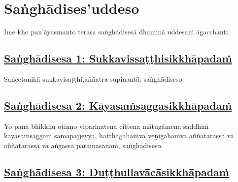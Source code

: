 
\setsecheadstyle{\sectionFmt}
\section{Saṅghādises'uddeso}
\label{sd}

\begin{intro}
	Ime kho pan'āyasmanto terasa saṅghādisesā dhammā uddesaṁ āgacchanti.
\end{intro}

\subsection*{\hyperref[comm1]{Saṅghādisesa 1: Sukkavissaṭṭhisikkhāpadaṁ}}

\label{sd1}

Sañcetanikā sukkavisaṭṭhi,\makeatletter\hyperlink{endnote38-appendix}\makeatother \thinspace aññatra supinantā, saṅghādiseso.



\subsection*{\hyperref[comm2]{Saṅghādisesa 2: Kāyasaṁsaggasikkhāpadaṁ}}
\label{sd2}

Yo pana bhikkhu otiṇṇo vipariṇatena cittena mātugāmena saddhiṁ kāyasaṁsaggaṁ samāpajjeyya, hatthagāhaṁ\makeatletter\hyperlink{endnote39-appendix}\makeatother \thinspace vā veṇigāhaṁ\makeatletter\hyperlink{endnote40-appendix}\makeatother \thinspace vā aññatarassa vā aññatarassa vā aṅgassa parāmasanaṁ, saṅghādiseso.



\subsection*{\hyperref[comm3]{Saṅghādisesa 3: Duṭṭhullavācāsikkhāpadaṁ}}
\label{sd3}


